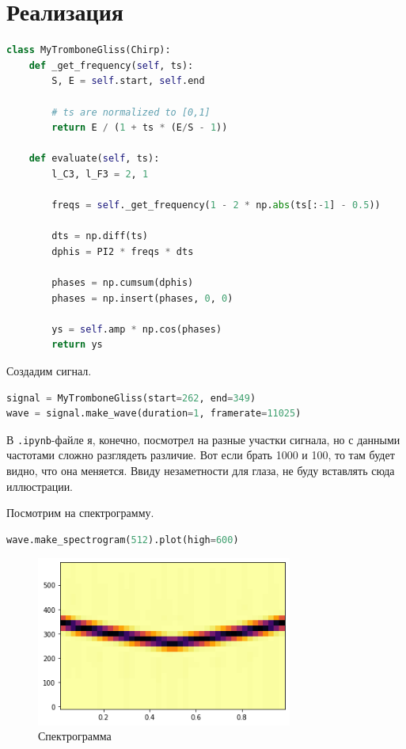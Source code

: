 \documentclass[a4paper,12pt]{report}
\begin{document}
    \section{Реализация}
    
\begin{lstlisting}[language=Python,caption=Код \texttt{MyTromboneChirp}]
class MyTromboneGliss(Chirp):
    def _get_frequency(self, ts):
        S, E = self.start, self.end
        
        # ts are normalized to [0,1]
        return E / (1 + ts * (E/S - 1))
    
    def evaluate(self, ts):
        l_C3, l_F3 = 2, 1
        
        freqs = self._get_frequency(1 - 2 * np.abs(ts[:-1] - 0.5))
        
        dts = np.diff(ts)
        dphis = PI2 * freqs * dts
        
        phases = np.cumsum(dphis)
        phases = np.insert(phases, 0, 0)
        
        ys = self.amp * np.cos(phases)
        return ys
\end{lstlisting}

    Создадим сигнал.
    
\begin{lstlisting}[language=Python,caption=Искомый сигнал]
signal = MyTromboneGliss(start=262, end=349)
wave = signal.make_wave(duration=1, framerate=11025)
\end{lstlisting}

    В \texttt{.ipynb}-файле я, конечно, посмотрел на разные участки сигнала, но с данными частотами сложно разглядеть различие. Вот если брать 1000 и 100, то там будет видно, что она меняется. Ввиду незаметности для глаза, не буду вставлять сюда иллюстрации.
    
    Посмотрим на спектрограмму.
    
\begin{lstlisting}[language=Python,caption=Спектрограмма]
wave.make_spectrogram(512).plot(high=600)
\end{lstlisting}

    \begin{figure}[H]
        \centering
        \includegraphics[width=0.75\textwidth]{ex5_spectrogram.png}
        \caption{Спектрограмма}
        \label{fig:ex5_spectrogram}
    \end{figure}
    
\end{document}
